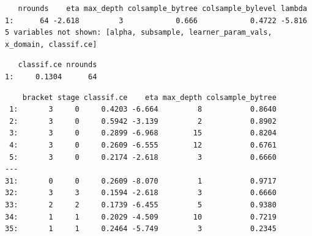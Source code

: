 \begin{Shaded}
\begin{Highlighting}[]
\SpecialCharTok{$}
\end{Highlighting}
\end{Shaded}

\begin{verbatim}
   nrounds    eta max_depth colsample_bytree colsample_bylevel lambda
1:      64 -2.618         3            0.666            0.4722 -5.816
5 variables not shown: [alpha, subsample, learner_param_vals, x_domain, classif.ce]
\end{verbatim}

\begin{Shaded}
\begin{Highlighting}[]
\SpecialCharTok{$}
\end{Highlighting}
\end{Shaded}

\begin{verbatim}
   classif.ce nrounds
1:     0.1304      64
\end{verbatim}

\begin{Shaded}
\begin{Highlighting}[]
\SpecialCharTok{$}\NormalTok{archive)[,}
\NormalTok{  .(bracket, stage, classif.ce, eta, max\_depth, colsample\_bytree)]}
\end{Highlighting}
\end{Shaded}

\begin{verbatim}
    bracket stage classif.ce    eta max_depth colsample_bytree
 1:       3     0     0.4203 -6.664         8           0.8640
 2:       3     0     0.5942 -3.139         2           0.8902
 3:       3     0     0.2899 -6.968        15           0.8204
 4:       3     0     0.2609 -6.555        12           0.6761
 5:       3     0     0.2174 -2.618         3           0.6660
---                                                           
31:       0     0     0.2609 -8.070         1           0.9717
32:       3     3     0.1594 -2.618         3           0.6660
33:       2     2     0.1739 -6.455         5           0.9380
34:       1     1     0.2029 -4.509        10           0.7219
35:       1     1     0.2464 -5.749         3           0.2345
\end{verbatim}

